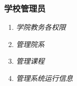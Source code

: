 \subsubsection{学校管理员}
\begin{enumerate}
    \item \textit{学院教务各权限} \quad 
    \item \textit{管理院系} \quad 
    \item \textit{管理课程} \quad 
    \item \textit{管理系统运行信息} \quad 
\end{enumerate}
